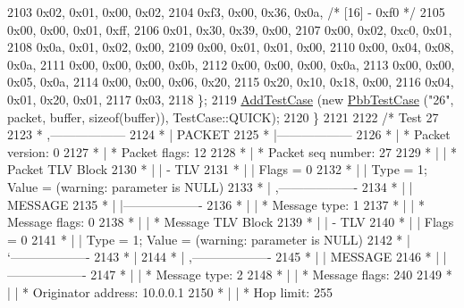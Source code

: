 \begin{DoxyCode}
2103       0x02, 0x01, 0x00, 0x02,
2104       0xf3, 0x00, 0x36, 0x0a,   \textcolor{comment}{/* [16] - 0xf0 */}
2105       0x00, 0x00, 0x01, 0xff,
2106       0x01, 0x30, 0x39, 0x00,
2107       0x00, 0x02, 0xc0, 0x01,
2108       0x0a, 0x01, 0x02, 0x00,
2109       0x00, 0x01, 0x01, 0x00,
2110       0x00, 0x04, 0x08, 0x0a,
2111       0x00, 0x00, 0x00, 0x0b,
2112       0x00, 0x00, 0x00, 0x0a,
2113       0x00, 0x00, 0x05, 0x0a,
2114       0x00, 0x00, 0x06, 0x20,
2115       0x20, 0x10, 0x18, 0x00,
2116       0x04, 0x01, 0x20, 0x01,
2117       0x03,
2118     \};
2119     \hyperlink{classns3_1_1TestCase_a3718088e3eefd5d6454569d2e0ddd835}{AddTestCase} (\textcolor{keyword}{new} \hyperlink{classPbbTestCase}{PbbTestCase} (\textcolor{stringliteral}{"26"}, packet, buffer, \textcolor{keyword}{sizeof}(buffer)), 
      TestCase::QUICK);
2120   \}
2121 
2122   \textcolor{comment}{/* Test 27}
2123 \textcolor{comment}{         * ,------------------}
2124 \textcolor{comment}{         * |  PACKET}
2125 \textcolor{comment}{         * |------------------}
2126 \textcolor{comment}{         * | * Packet version:    0}
2127 \textcolor{comment}{         * | * Packet flags:  12}
2128 \textcolor{comment}{         * | * Packet seq number: 27}
2129 \textcolor{comment}{         * |    | * Packet TLV Block}
2130 \textcolor{comment}{         * |    |     - TLV}
2131 \textcolor{comment}{         * |    |         Flags = 0}
2132 \textcolor{comment}{         * |    |         Type = 1; Value = (warning: parameter is NULL)}
2133 \textcolor{comment}{         * |    ,-------------------}
2134 \textcolor{comment}{         * |    |  MESSAGE}
2135 \textcolor{comment}{         * |    |-------------------}
2136 \textcolor{comment}{         * |    | * Message type:       1}
2137 \textcolor{comment}{         * |    | * Message flags:  0}
2138 \textcolor{comment}{         * |    | * Message TLV Block}
2139 \textcolor{comment}{         * |    |     - TLV}
2140 \textcolor{comment}{         * |    |         Flags = 0}
2141 \textcolor{comment}{         * |    |         Type = 1; Value = (warning: parameter is NULL)}
2142 \textcolor{comment}{         * |    `-------------------}
2143 \textcolor{comment}{         * |}
2144 \textcolor{comment}{         * |    ,-------------------}
2145 \textcolor{comment}{         * |    |  MESSAGE}
2146 \textcolor{comment}{         * |    |-------------------}
2147 \textcolor{comment}{         * |    | * Message type:       2}
2148 \textcolor{comment}{         * |    | * Message flags:  240}
2149 \textcolor{comment}{         * |    | * Originator address: 10.0.0.1}
2150 \textcolor{comment}{         * |    | * Hop limit:          255}

\end{DoxyCode}
